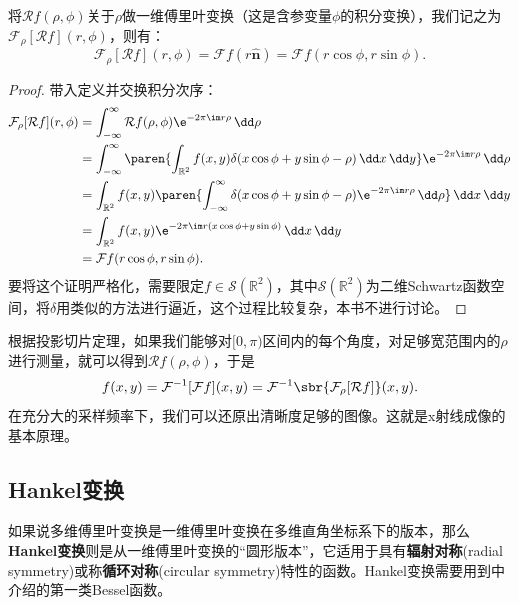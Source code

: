 \begin{theorem}[投影切片定理]
    将$\mathcal{R}f(\rho,\phi)$关于$\rho$做一维傅里叶变换（这是含参变量$\phi$的积分变换），我们记之为$\mathcal{F}_{\rho}[\mathcal{R}f](r,\phi)$，则有：
    \begin{equation}
        \mathcal{F}_{\rho}[\mathcal{R}f](r,\phi)=\mathcal{F}f(r\hat{\mathbf{n}})=\mathcal{F}f(r\cos\phi,r\sin\phi).
    \end{equation}
\end{theorem}
\begin{proof}
    带入定义并交换积分次序：
    \begin{align}
        \mathcal{F}_{\rho}[\mathcal{R}f](r,\phi)&=\int_{-\infty}^{\infty}\mathcal{R}f(\rho,\phi)\e^{-2\pi\im r\rho}\,\dd\rho\nonumber\\
        &=\int_{-\infty}^{\infty}\paren{\int_{\mathbb{R}^2}f(x,y)\delta(x\cos\phi+y\sin\phi-\rho)\,\dd x\,\dd y}\e^{-2\pi\im r\rho}\,\dd\rho\nonumber\\
        &=\int_{\mathbb{R}^2}f(x,y)\paren{\int_{-\infty}^{\infty}\delta(x\cos\phi+y\sin\phi-\rho)\e^{-2\pi\im r\rho}\,\dd\rho}\,\dd x\,\dd y\nonumber\\
        &=\int_{\mathbb{R}^2}f(x,y)\e^{-2\pi\im r(x\cos\phi+y\sin\phi)}\,\dd x\,\dd y\nonumber\\
        &=\mathcal{F}f(r\cos\phi,r\sin\phi).
    \end{align}
    要将这个证明严格化，需要限定$f\in\mathcal{S}(\mathbb{R}^2)$，其中$\mathcal{S}(\mathbb{R}^2)$为二维Schwartz函数空间，将$\delta$用类似的方法进行逼近，这个过程比较复杂，本书不进行讨论。
\end{proof}

根据投影切片定理，如果我们能够对$[0,\pi)$区间内的每个角度，对足够宽范围内的$\rho$进行测量，就可以得到$\mathcal{R}f(\rho,\phi)$，于是
\begin{equation}
    f(x,y)=\mathcal{F}^{-1}[\mathcal{F}f](x,y)=\mathcal{F}^{-1}\sbr{\mathcal{F}_{\rho}[\mathcal{R}f]}(x,y).
\end{equation}
在充分大的采样频率下，我们可以还原出清晰度足够的图像。这就是x射线成像的基本原理。

\subsection{Hankel变换}\label{sub:hankel}

如果说多维傅里叶变换是一维傅里叶变换在多维直角坐标系下的版本，那么\textbf{Hankel变换}则是从一维傅里叶变换的“圆形版本”，它适用于具有\textbf{辐射对称}(radial symmetry)或称\textbf{循环对称}(circular symmetry)特性的函数。Hankel变换需要用到中介绍的第一类Bessel函数。


